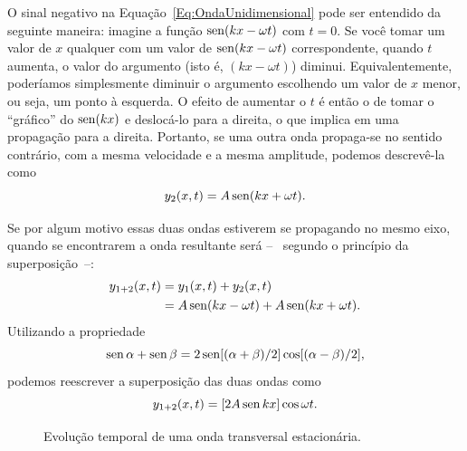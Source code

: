 O sinal negativo na Equação~\eqref{Eq:OndaUnidimensional} pode ser entendido da seguinte maneira: imagine a função $\operatorname{sen}(kx - \omega t)$ com $t=0$. Se você tomar um valor de $x$ qualquer com um valor de $\operatorname{sen}(kx-\omega t)$ correspondente, quando $t$ aumenta, o valor do argumento (isto é, $(kx -\omega t)$) diminui. Equivalentemente, poderíamos simplesmente diminuir o argumento escolhendo um valor de $x$ menor, ou seja, um ponto à esquerda. O efeito de aumentar o $t$ é então o de tomar o ``gráfico'' do $\operatorname{sen}(kx)$ e deslocá-lo para a direita, o que implica em uma propagação para a direita. Portanto, se uma outra onda propaga-se no sentido contrário, com a mesma velocidade e a mesma amplitude, podemos descrevê-la como
\begin{equation}
	y_2(x,t) = A \operatorname{sen}(kx + \omega t).
\end{equation}

Se por algum motivo essas duas ondas estiverem se propagando no mesmo eixo, quando se encontrarem a onda resultante será --~ segundo o princípio da superposição~--:
\begin{align}
	y_{1+2}(x,t) &= y_1(x,t) + y_2(x,t)\\
	&= A \operatorname{sen}(kx -\omega t) + A \operatorname{sen}(kx + \omega t).
\end{align}
Utilizando a propriedade
\begin{equation}
	\operatorname{sen} \alpha + \operatorname{sen} \beta = 2 \operatorname{sen}[(\alpha + \beta)/2]\cos[(\alpha-\beta)/2],
\end{equation}
podemos reescrever a superposição das duas ondas como
\begin{equation}\label{Eq:EqOndaEstacionaria}
	y_{1+2}(x,t)=[2A\operatorname{sen} kx]\cos\omega t.
\end{equation}

\begin{figure}[!htb]
\centering
\forcerectofloat
{}
\caption{Evolução temporal de uma onda transversal estacionária.}
\label{Fig:OndaEstacionaria}
\end{figure}

